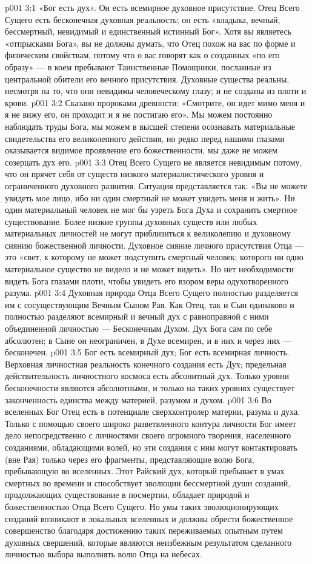 \vs p001 3:1 «Бог есть дух». Он есть всемирное духовное присутствие. Отец Всего Сущего есть бесконечная духовная реальность; он есть «владыка, вечный, бессмертный, невидимый и единственный истинный Бог». Хотя вы являетесь «отпрысками Бога», вы не должны думать, что Отец похож на вас по форме и физическим свойствам, потому что о вас говорят как о созданных «по его образу» --- в коем пребывают Таинственные Помощники, посланные из центральной обители его вечного присутствия. Духовные существа реальны, несмотря на то, что они невидимы человеческому глазу; и не созданы из плоти и крови.
\vs p001 3:2 Сказано пророками древности: «Смотрите, он идет мимо меня и я не вижу его, он проходит и я не постигаю его». Мы можем постоянно наблюдать труды Бога, мы можем в высшей степени осознавать материальные свидетельства его великолепного действия, но редко перед нашими глазами оказывается видимое проявление его божественности, мы даже не можем созерцать дух его.
\vs p001 3:3 Отец Всего Сущего не является невидимым потому, что он прячет себя от существ низкого материалистического уровня и ограниченного духовного развития. Ситуация представляется так: «Вы не можете увидеть мое лицо, ибо ни один смертный не может увидеть меня и жить». Ни один материальный человек не мог бы узреть Бога Духа и сохранить смертное существование. Более низкие группы духовных существ или любых материальных личностей не могут приблизиться к великолепию и духовному сиянию божественной личности. Духовное сияние личного присутствия Отца --- это «свет, к которому не может подступить смертный человек; которого ни одно материальное существо не видело и не может видеть». Но нет необходимости видеть Бога глазами плоти, чтобы увидеть его взором веры одухотворенного разума.
\vs p001 3:4 \pc Духовная природа Отца Всего Сущего полностью разделяется им с сосуществующим Вечным Сыном Рая. Как Отец, так и Сын одинаково и полностью разделяют всемирный и вечный дух с равноправной с ними объединенной личностью --- Бесконечным Духом. Дух Бога сам по себе абсолютен; в Сыне он неограничен, в Духе всемирен, и в них и через них --- бесконечен.
\vs p001 3:5 \pc Бог есть всемирный дух; Бог есть всемирная личность. Верховная личностная реальность конечного создания есть Дух; предельная действительность личностного космоса есть абсонитный дух. Только уровни бесконечности являются абсолютными, и только на таких уровнях существует законченность единства между материей, разумом и духом.
\vs p001 3:6 \pc Во вселенных Бог Отец есть в потенциале сверхконтролер материи, разума и духа. Только с помощью своего широко разветвленного контура личности Бог имеет дело непосредственно с личностями своего огромного творения, населенного созданиями, обладающими волей, но эти создания с ним могут контактировать (вне Рая) только через его фрагменты, представляющие волю Бога, пребывающую во вселенных. Этот Райский дух, который пребывает в умах смертных во времени и способствует эволюции бессмертной души созданий, продолжающих существование в посмертии, обладает природой и божественностью Отца Всего Сущего. Но умы таких эволюционирующих созданий возникают в локальных вселенных и должны обрести божественное совершенство благодаря достижению таких переживаемых опытным путем духовных свершений, которые являются неизбежным результатом сделанного личностью выбора выполнять волю Отца на небесах.
